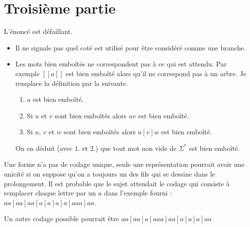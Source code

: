 \section{Troisième partie}
L'énoncé est défaillant.

\begin{itemize}
    \item Il ne signale pas quel coté est utilisé pour être considéré comme une branche.
    \item Les mots bien emboîtés ne correspondent pas à ce qui est attendu. Par exemple $[[a]]$ est bien emboîté alors qu'il ne correspond pas à un arbre.
    Je remplace la définition par la suivante.
    \begin{enumerate}
        \item $a$ est bien emboîté.
        \item Si $u$ et $v$ sont bien emboîtés alors $uv$ est bien emboîté.
        \item Si $u$, $v$ et $w$ sont bien emboîtés alors $u[v]w$ est bien emboîté.
    \end{enumerate}
    On en déduit (avec 1. et 2.) que tout mot non vide de $\Sigma^*$ est bien emboîté.
\end{itemize}
\begin{Exercise}Une forme n'a pas de codage unique, seule une représentation pourrait avoir une unicité si on suppose qu'on a toujours un des fils qui se dessine dans le prolongement. Il est probable que le sujet attendait le codage qui consiste à remplacer chaque lettre par un $a$ dans l'exemple fourni :
$aa[aa]aa[a[a]a]a[aaa]aa$.

Un autre codage possible pourrait être $aa[aa[a[aaa]aa]a[a]a]aa$
\end{Exercise}

